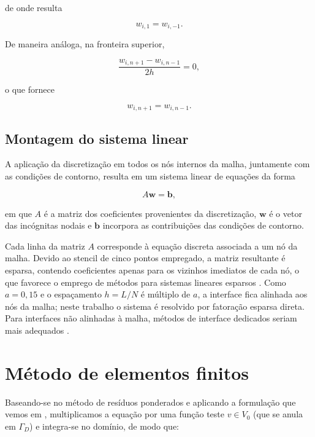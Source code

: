 \documentclass[brazil]{TCAM} %
\begin{document}
de onde resulta

\begin{equation*}
w_{i,1}=w_{i,-1}.
\end{equation*}

De maneira análoga, na fronteira superior,

\begin{equation*}
\frac{w_{i,n+1}-w_{i,n-1}}{2h}=0,
\end{equation*}

o que fornece

\begin{equation*}
w_{i,n+1}=w_{i,n-1}.
\end{equation*}

\subsection{Montagem do sistema linear}

A aplicação da discretização em todos os nós internos da malha,
juntamente com as condições de contorno, resulta em um sistema linear
de equações da forma

\begin{equation*}
A\mathbf{w}=\mathbf{b},
\end{equation*}

em que $A$ é a matriz dos coeficientes provenientes da discretização,
$\mathbf{w}$ é o vetor das incógnitas nodais e $\mathbf{b}$ incorpora
as contribuições das condições de contorno.

Cada linha da matriz $A$ corresponde à equação discreta associada a um
nó da malha. Devido ao stencil de cinco pontos empregado, a matriz
resultante é esparsa, contendo coeficientes apenas para os vizinhos
imediatos de cada nó, o que favorece o emprego de métodos para sistemas
lineares esparsos \cite{saad2003iterative}. Como $a=0{,}15$ e o espaçamento
$h=L/N$ é múltiplo de $a$, a interface fica alinhada aos nós da malha; neste
trabalho o sistema é resolvido por fatoração esparsa direta. Para interfaces não
alinhadas à malha, métodos de interface dedicados seriam mais adequados
\cite{li2006immersed}.

\section{Método de elementos finitos}

Baseando-se no método de resíduos ponderados e aplicando a formulação que vemos em \cite{logan,hughes2000finite}, multiplicamos a equação por uma função teste $v \in V_0$ (que se anula em $\Gamma_D$) e integra-se no domínio, de modo que:
\end{document}
